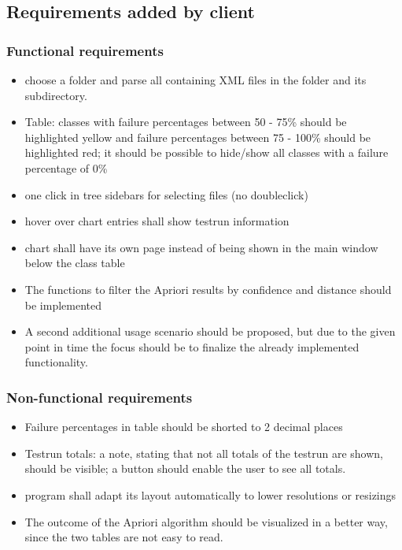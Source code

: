 \subsection{Requirements added by client}
\subsubsection{Functional requirements}

\begin{itemize}

\item choose a folder and parse all containing XML files in the folder and its subdirectory.

\item Table: classes with failure percentages between 50 - 75\% should be highlighted yellow and failure percentages between 75 - 100\% should be highlighted red; it should be possible to hide/show all classes with a failure percentage of 0\%

\item one click in tree sidebars for selecting files (no doubleclick)
\item hover over chart entries shall show testrun information
\item chart shall have its own page instead of being shown in the main window below the class table
\item The functions to filter the Apriori results by confidence and distance should be implemented

\item A second additional usage scenario should be proposed, but due to the given point in time the focus should be to finalize the already implemented functionality.

\end{itemize}

\subsubsection{Non-functional requirements}
\begin{itemize}

\item Failure percentages in table should be shorted to 2 decimal places
\item Testrun totals: a note, stating that not all totals of the testrun are shown, should be visible; a button should enable the user to see all totals.

\item program shall adapt its layout automatically to lower resolutions or resizings
\item The outcome of the Apriori algorithm should be visualized in a better way, since the two tables are not easy to read.
\end{itemize}
